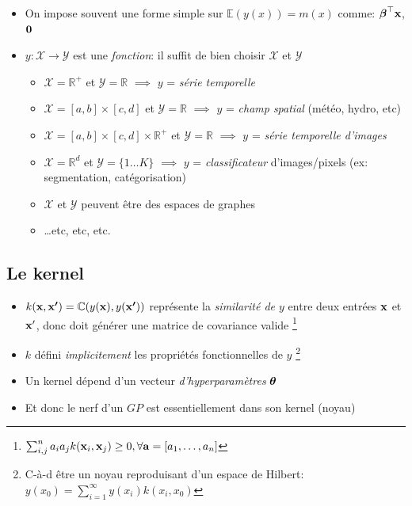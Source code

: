 \documentclass[xcolor=svgnames, t]{beamer}
\newcommand{\vectorx}[1]{\boldsymbol{\MakeLowercase{\mathbf{#1}}}}
\newcommand{\coloredemph}[1]{\textcolor{internationalblue}{\emph{#1}}}
\begin{document}
\begin{frame}{\subsecname}
  
  \begin{itemize}
    \item On impose souvent une forme simple sur $\mathbb{E}(y(x)) = m(x)$ 
    comme: $\vectorx{\beta}^\top \vectorx{x}$, $\vectorx{0}$
    \pause
    \item $y: \mathcal{X} \to \mathcal{Y}$ est une \coloredemph{fonction}: il suffit de bien choisir $\mathcal{X}$ et $\mathcal{Y}$
    \begin{itemize}
      \item $\mathcal{X} = \mathbb{R}^{+}$ et $\mathcal{Y} = \mathbb{R}$ $\implies$
      $y$ = \coloredemph{série temporelle}
      \pause
      \item $\mathcal{X} = [a, b] \times [c, d]$ et  $\mathcal{Y} = \mathbb{R}$ $\implies$
      $y$ = \coloredemph{champ spatial} (météo, hydro, etc)
      \pause
      \item $\mathcal{X} = [a, b] \times [c, d] \times \mathbb{R}^{+}$ et $\mathcal{Y} = \mathbb{R}$ $\implies$
      $y$ = \coloredemph{série temporelle d'images}
      \pause
      \item $\mathcal{X} = \mathbb{R}^{d}$ et $\mathcal{Y} = \{1 \dots K \}$ $\implies$
      $y$ = \coloredemph{classificateur} d'images/pixels (ex: segmentation, catégorisation)
      \item $\mathcal{X}$ et $\mathcal{Y}$ peuvent être des espaces de graphes
      \item \dots etc, etc, etc.
    \end{itemize}
  \end{itemize}
\end{frame}

\subsection{Le kernel}
\begin{frame}{\subsecname}
  \begin{itemize}
    \item $k(\vectorx{x}, \vectorx{x^{\prime}}) = \mathbb{C}( y(\vectorx{x}), y(\vectorx{x^\prime}) )$
     représente la \coloredemph{similarité de $y$} entre deux entrées $\vectorx{x}$ et $\vectorx{x}^\prime$,
     donc doit générer une matrice de covariance valide
     \footnote{
      $\sum_{i,j}^{n} a_i a_j k(\vectorx{x}_i, \vectorx{x}_j) \geq 0, \forall \vectorx{a} = [a_1, \dots, a_n]$
    }
    \pause
    \item $k$ défini \coloredemph{implicitement} les propriétés fonctionnelles de $y$
    \footnote{
      C-à-d être un noyau reproduisant d'un espace de Hilbert:
      $y(x_0) = \sum_{i=1}^{\infty} y(x_i) k(x_i, x_0)$ 
    }
    \pause
    \item Un kernel dépend d'un vecteur \coloredemph{d'hyperparamètres} $\vectorx{\theta}$
    \pause
    \item Et donc le nerf d'un $GP$ est essentiellement dans son kernel (noyau)
  \end{itemize}
\end{frame}
\end{document}

